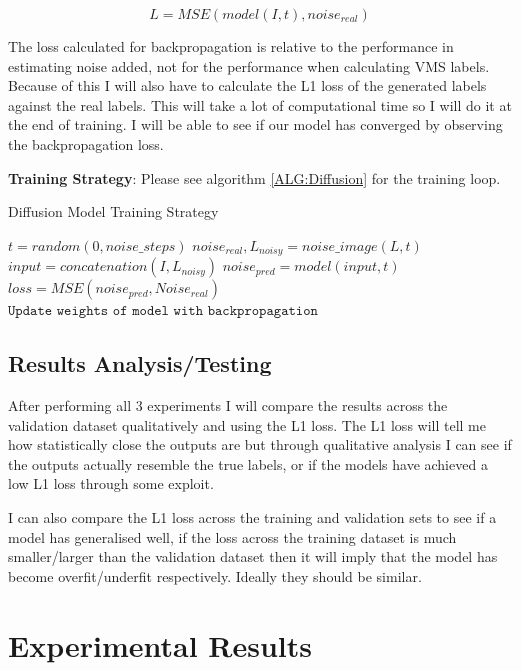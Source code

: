 \documentclass{UoYCSproject}
\begin{document}
\[ L = MSE( model(I, t), noise_{real} ) \]

The loss calculated for backpropagation is relative to the performance in estimating noise added, not for the performance when calculating VMS labels. Because of this I will also have to calculate the L1 loss of the generated labels against the real labels. This will take a lot of computational time so I will do it at the end of training. I will be able to see if our model has converged by observing the backpropagation loss. 

\textbf{Training Strategy}: Please see algorithm \ref{ALG:Diffusion} for the training loop.

\begin{algorithm}
\caption{Diffusion Model Training Strategy}\label{ALG:Diffusion}
\begin{algorithmic}[1]
\State
\State $t = random(0, noise\_steps)$
\State $noise_{real}, L_{noisy} = noise\_image(L, t)$ 
\State
\State $input = concatenation(I, L_{noisy})$
\State $noise_{pred} = model(input, t)$
\State $loss = MSE( noise_{pred}, Noise_{real} )$
\State $\texttt{Update weights of model with backpropagation}$
\EndFor
\EndFor
\end{algorithmic}
\end{algorithm}

\section{Results Analysis/Testing}

After performing all 3 experiments I will compare the results across the validation dataset qualitatively and using the L1 loss. The L1 loss will tell me how statistically close the outputs are but through qualitative analysis I can see if the outputs actually resemble the true labels, or if the models have achieved a low L1 loss through some exploit. 


I can also compare the L1 loss across the training and validation sets to see if a model has generalised well, if the loss across the training dataset is much smaller/larger than the validation dataset then it will imply that the model has become overfit/underfit respectively. Ideally they should be similar. 


\chapter{Experimental Results}
\end{document}
